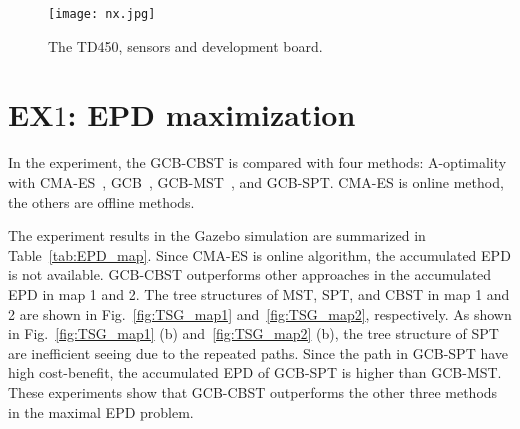 \begin{figure}[htbp]
  \centering
  \texttt{[image: nx.jpg]}
  \caption{The TD450, sensors and development board.}
  \label{fig:nx}
\end{figure}

\section{EX$1$: EPD maximization}


In the experiment, the GCB-CBST is compared with four methods: A-optimality with CMA-ES~\cite{popovic2020informative}, GCB~\cite{zhang2016submodular}, GCB-MST~\cite{lin2023improvement}, and GCB-SPT. CMA-ES is online method, the others are offline methods.


The experiment results in the Gazebo simulation are summarized in Table~\ref{tab:EPD_map}.
Since CMA-ES is online algorithm, the accumulated EPD is not available.
GCB-CBST outperforms other approaches in the accumulated EPD in map 1 and 2.
The tree structures of MST, SPT, and CBST in map 1 and 2 are shown in Fig.~\ref{fig:TSG_map1} and~\ref{fig:TSG_map2}, respectively.
As shown in Fig.~\ref{fig:TSG_map1} (b) and~\ref{fig:TSG_map2} (b),
the tree structure of SPT are inefficient seeing due to the repeated paths.
Since the path in GCB-SPT have high cost-benefit, the accumulated EPD of GCB-SPT is higher than GCB-MST.
These experiments show that GCB-CBST outperforms the other three methods in the maximal EPD problem.



